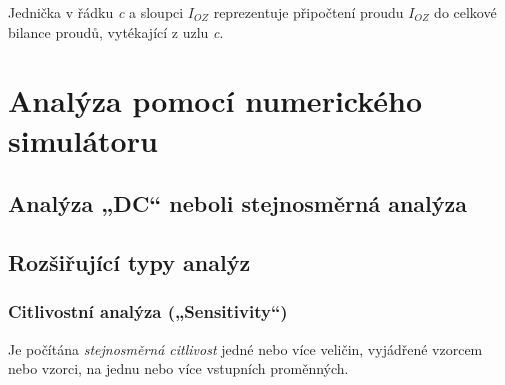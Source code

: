           Jednička v řádku \emph{c} a sloupci $I_{OZ}$ reprezentuje připočtení proudu $I_{OZ}$ do 
          celkové bilance proudů, vytékající z uzlu \emph{c}.
        
              

              
              

  \section{Analýza pomocí numerického simulátoru}
    \subsection{Analýza „DC“ neboli stejnosměrná analýza}
    \subsection{Rozšiřující typy analýz}
      \subsubsection{Citlivostní analýza („Sensitivity“)}
        Je počítána \emph{stejnosměrná citlivost} jedné nebo více veličin, vyjádřené vzorcem nebo 
        vzorci, na jednu nebo více vstupních proměnných.

              

